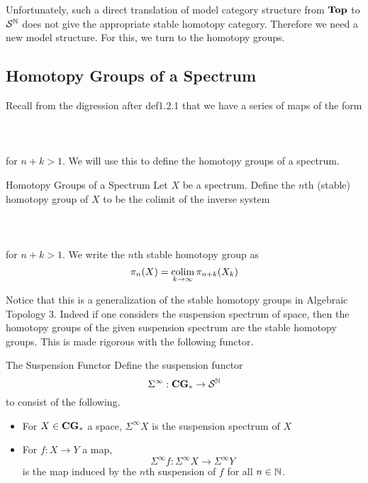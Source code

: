 \documentclass[a4paper]{article}
\begin{document}
Unfortunately, such a direct translation of model category structure from $\bold{Top}$ to $\mathcal{S}^{\mathbb{N}}$ does not give the appropriate stable homotopy category. Therefore we need a new model structure. For this, we turn to the homotopy groups. 

\subsection{Homotopy Groups of a Spectrum}
Recall from the digression after def1.2.1 that we have a series of maps of the form \\~\\
\\~\\
for $n+k>1$. We will use this to define the homotopy groups of a spectrum. 

\begin{defn}{Homotopy Groups of a Spectrum}{} Let $X$ be a spectrum. Define the $n$th (stable) homotopy group of $X$ to be the colimit of the inverse system \\~\\
\\~\\
for $n+k>1$. We write the $n$th stable homotopy group as $$\pi_n(X)=\operatorname*{colim}_{k\to\infty}\pi_{n+k}(X_k)$$
\end{defn}

Notice that this is a generalization of the stable homotopy groups in Algebraic Topology 3. Indeed if one considers the suspension spectrum of space, then the homotopy groups of the given suspension spectrum are the stable homotopy groups. This is made rigorous with the following functor. 

\begin{defn}{The Suspension Functor}{} Define the suspension functor $$\Sigma^\infty:\bold{CG}_\ast\to\mathcal{S}^{\mathbb{N}}$$ to consist of the following. 
\begin{itemize}
\item For $X\in\bold{CG}_\ast$ a space, $\Sigma^\infty X$ is the suspension spectrum of $X$
\item For $f:X\to Y$ a map, $$\Sigma^\infty f:\Sigma^\infty X\to\Sigma^\infty Y$$ is the map induced by the $n$th suspension of $f$ for all $n\in\mathbb{N}$. 
\end{itemize}
\end{defn}
\end{document}
